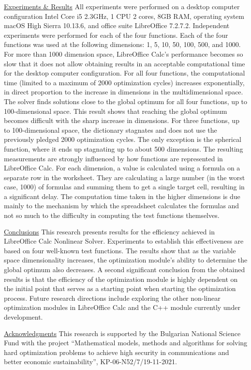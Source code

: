 \documentclass{article}
\begin{document}
\vspace*{2mm}
\underline{Experiments \& Results}  \hspace*{4mm}
All experiments were performed on a desktop computer configuration Intel Core i5 2.3GHz, 1 CPU 2 cores, 8GB RAM, operating system macOS High Sierra 10.13.6, and office suite LibreOffice 7.2.7.2.
%
Independent experiments were performed for each of the four functions. Each of the four functions was used at the following dimensions: 1, 5, 10, 50, 100, 500, and 1000. For more than 1000 dimension space, LibreOffice Calc's performance becomes so slow that it does not allow obtaining results in an acceptable computational time for the desktop computer configuration.
%
For all four functions, the computational time (limited to a maximum of 2000 optimization cycles) increases exponentially, in direct proportion to the increase in dimensions in the multidimensional space. The solver finds solutions close to the global optimum for all four functions, up to 100-dimensional space. This result shows that reaching the global optimum becomes difficult with the sharp increase in dimensions. For three functions, up to 100-dimensional space, the dictionary stagnates and does not use the previously pledged 2000 optimization cycles. The only exception is the spherical function, where it ends up stagnating up to about 500 dimensions.
%
The resulting measurements are strongly influenced by how functions are represented in LibreOffice Calc. For each dimension, a value is calculated using a formula on a separate row in the worksheet. They are calculating a large number (in the worst case, 1000) of formulas and summing them to get a single target cell, resulting in a significant delay. The computation time taken in the higher dimensions is due mainly to the mechanism by which the spreadsheet calculates the formulas and not so much to the difficulty in computing the test functions themselves.

\vspace*{2mm}
\underline{Conclusions}  \hspace*{4mm}
This research presents results for the efficiency achieved in LibreOffice Calc Nonlinear Solver. Experiments to establish this effectiveness are based on four well-known test functions. The results show that as the variable space dimensionality increases, the optimization module's ability to determine the global optimum also decreases. A second significant conclusion from the obtained results is that the efficiency of the optimization module is highly dependent on the initial point that serves as a starting point when starting the optimization process.
%
Future research directions include exploring the other non-linear optimization modules in LibreOffice Calc and the C++ module currently under development.

\vspace*{2mm}
\underline{Acknowledgments} \hspace*{4mm}
This research is supported by the Bulgarian National Science Fund with the project “Mathematical models, methods and algorithms for solving hard optimization problems to achieve high security in communications and better economic sustainability”, KP-06-N52/7/19-11-2021.
\end{document}
